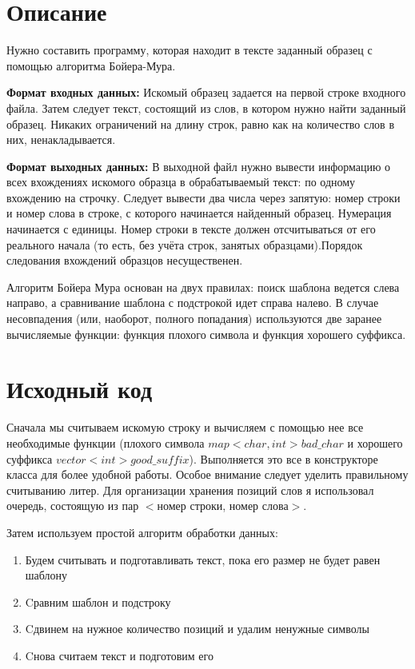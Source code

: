 \section{Описание}

Нужно составить программу, которая находит в тексте заданный образец с помощью алгоритма Бойера-Мура.


{\bfseries Формат входных данных:} Искомый образец задается на первой строке входного файла. Затем следует текст, состоящий из слов, в котором нужно найти заданный образец. Никаких ограничений на длину строк, равно как на количество слов в них, ненакладывается. 


{\bfseries Формат выходных данных:} В выходной файл нужно вывести информацию о всех вхождениях искомого образца в
обрабатываемый текст: по одному вхождению на строчку. Следует вывести два числа через запятую: номер строки и номер слова в строке, с которого начинается найденный образец. Нумерация начинается с единицы. Номер строки в тексте должен отсчитываться от его реального начала (то есть, без учёта строк, занятых образцами).Порядок следования вхождений образцов несущественен.


Алгоритм Бойера Мура основан на двух правилах: поиск шаблона ведется слева направо, а сравнивание шаблона с подстрокой идет справа налево. В случае несовпадения (или, наоборот, полного попадания) используются две заранее вычисляемые функции: функция плохого символа и функция хорошего суффикса.

\pagebreak

\section{Исходный код}


Сначала мы считываем искомую строку и вычисляем с помощью нее все необходимые функции (плохого символа $map<char, int> bad\_char$ и хорошего суффикса $vector<int> good\_suffix$). Выполняется это все в конструкторе класса для более удобной работы. Особое внимание следует уделить правильному считыванию литер. Для организации хранения позиций слов я использовал очередь, состоящую из пар $<$номер строки, номер слова$>$. 

Затем используем простой алгоритм обработки данных:
\begin{enumerate}
\item{Будем считывать и подготавливать текст, пока его размер не будет равен шаблону}
\item{Cравним шаблон и подстроку}
\item{Cдвинем на нужное количество позиций и удалим ненужные символы}
\item{Cнова считаем текст и подготовим его}
\end{enumerate}
	


